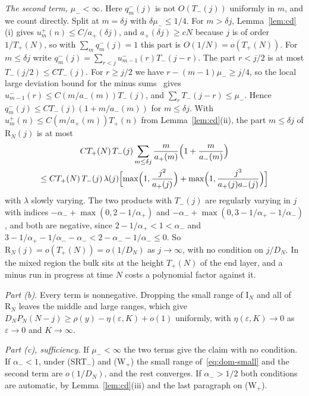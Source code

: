 \emph{The second term, $\mu_\minus<\infty$.} Here $q^\minus_m(j)$ is not $O(T_\minus(j))$ uniformly in
$m$, and we count directly. Split at $m=\delta j$ with $\delta\mu_\minus\le1/4$. For $m>\delta j$,
Lemma~\ref{lem:cd}(i) gives $u^\plus_m(n)\le C/a_\plus(\delta j)$, and $a_\plus(\delta j)\ge cN$ because
$j$ is of order $1/T_\plus(N)$, so with $\sum_mq^\minus_m(j)=1$ this part is $O(1/N)=o(T_\plus(N))$.
For $m\le\delta j$ write $q^\minus_m(j)=\sum_{r<j}u^\minus_{m-1}(r)T_\minus(j-r)$. The part $r<j/2$ is
at most $T_\minus(j/2)\le CT_\minus(j)$. For $r\ge j/2$ we have $r-(m-1)\mu_\minus\ge j/4$, so the
local large deviation bound for the minus sums~\cite[Lemma~A.1(iii)]{paperF} gives
$u^\minus_{m-1}(r)\le C(m/a_\minus(m))T_\minus(j)$, and $\sum_rT_\minus(j-r)\le\mu_\minus$. Hence
$q^\minus_m(j)\le CT_\minus(j)(1+m/a_\minus(m))$ for $m\le\delta j$. With
$u^\plus_m(n)\le C(m/a_\plus(m))T_\plus(n)$ from Lemma~\ref{lem:cd}(ii), the part $m\le\delta j$ of
$\mathrm R_N(j)$ is at most
\begin{multline*}
 CT_{+}(N)\,T_{-}(j)\sum_{m\le\delta j}\frac m{a_{+}(m)}\Bigl(1+\frac m{a_{-}(m)}\Bigr)\\
 \le CT_{+}(N)\,T_{-}(j)\,\lambda(j)\Bigl[\max\Bigl(1,\frac{j^2}{a_{+}(j)}\Bigr)+\max\Bigl(1,\frac{j^3}{a_{+}(j)a_{-}(j)}\Bigr)\Bigr]
\end{multline*}
with $\lambda$ slowly varying. The two products with $T_\minus(j)$ are regularly varying in $j$
with indices $-\alpha_\minus+\max(0,2-1/\alpha_\plus)$ and
$-\alpha_\minus+\max(0,3-1/\alpha_\plus-1/\alpha_\minus)$, and both are negative, since
$2-1/\alpha_\plus<1<\alpha_\minus$ and $3-1/\alpha_\plus-1/\alpha_\minus-\alpha_\minus<2-\alpha_\minus-1/\alpha_\minus\le0$.
So $\mathrm R_N(j)=o(T_\plus(N))=o(1/D_N)$ as $j\to\infty$, with no condition on $j/D_N$. In the
mixed region the bulk sits at the height $T_\plus(N)$ of the end layer, and a minus run in
progress at time $N$ costs a polynomial factor against it.

\emph{Part (b).} Every term is nonnegative. Dropping the small range of $\mathrm I_N$ and all of
$\mathrm R_N$ leaves the middle and large ranges, which give
$D_NP_N(N-j)\ge\rho(y)-\eta(\varepsilon,K)+o(1)$ uniformly, with $\eta(\varepsilon,K)\to0$ as
$\varepsilon\to0$ and $K\to\infty$.

\emph{Part (c), sufficiency.} If $\mu_\minus<\infty$ the two terms give the claim with no
condition. If $\alpha_\minus<1$, under (SRT$_\minus$) and (W$_\plus$) the small range
of~\eqref{eq:dom-small} and the second term are $o(1/D_N)$, and the rest converges. If
$\alpha_\minus>1/2$ both conditions are automatic, by Lemma~\ref{lem:cd}(iii) and the last
paragraph on (W$_\plus$).


